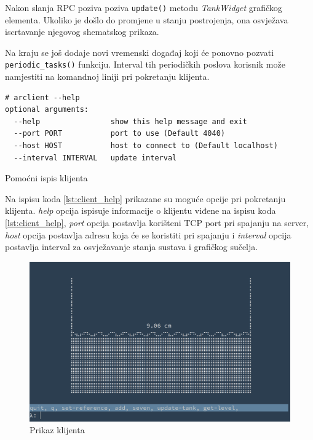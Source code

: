 Nakon slanja RPC poziva poziva \texttt{update()} metodu
\emph{TankWidget} grafičkog elementa. Ukoliko je došlo do promjene u stanju
postrojenja, ona osvježava iscrtavanje njegovog shematskog prikaza.

Na kraju se još dodaje novi vremenski događaj koji će ponovno pozvati
\texttt{periodic_tasks()} funkciju. Interval tih periodičkih 
poslova korisnik može namjestiti na
komandnoj liniji pri pokretanju klijenta.

\begin{listing}[H]
\centering
\begin{verbatim}
# arclient --help
optional arguments:
  --help                show this help message and exit
  --port PORT           port to use (Default 4040)
  --host HOST           host to connect to (Default localhost)
  --interval INTERVAL   update interval
\end{verbatim}
\caption{Pomoćni ispis klijenta}
\label{lst:client_help}
\end{listing}

Na ispisu koda \ref{lst:client_help} prikazane su moguće opcije pri pokretanju
klijenta. \emph{help} opcija ispisuje informacije o klijentu viđene na ispisu
koda \ref{lst:client_help}, \emph{port} opcija postavlja korišteni TCP port pri
spajanju na server, \emph{host} opcija postavlja adresu koja će se koristiti pri
spajanju i \emph{interval} opcija postavlja interval za osvježavanje stanja
sustava i grafičkog sučelja.

\begin{figure}[H]
\centering
\includegraphics[scale=0.25]{figures/arclient-2.png}
\caption{Prikaz klijenta}
\label{fig:client}
\end{figure}

